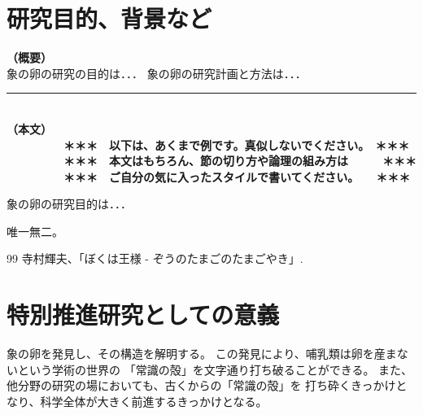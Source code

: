 \documentclass[11pt,a4j,dvipdfmx]{jarticle} 					%
\newcommand{\研究課題名}{象の卵}
\newcommand{\研究機関名}{逢坂大学}
\newcommand{\研究代表者氏名}{湯川秀樹}
\newcommand{\研究期間の最終元号年度}{10}  %
\begin{document}

\section{研究目的、背景など}

\JSPSInstructions		%
\noindent
\mbox{\textbf{（概要）}}\\
	象の卵の研究の目的は．．．	
	象の卵の研究計画と方法は．．．

\noindent
\rule{\linewidth}{1pt}\\
\noindent
\mbox{\textbf{（本文）}}
\textbf{\\　　　　　＊＊＊　以下は、あくまで例です。真似しないでください。　＊＊＊\\
　　　　　＊＊＊　本文はもちろん、節の切り方や論理の組み方は　　　＊＊＊\\
　　　　　＊＊＊　ご自分の気に入ったスタイルで書いてください。　　＊＊＊}

	 象の卵の研究目的は．．．

	唯一無二。




	\vspace{1cm}
	\begin{thebibliography}{99}
		 寺村輝夫、「ぼくは王様 - ぞうのたまごのたまごやき」.
	\end{thebibliography}




\section{特別推進研究としての意義}

	象の卵を発見し、その構造を解明する。
	この発見により、哺乳類は卵を産まないという学術の世界の
	「常識の殻」を文字通り打ち破ることができる。
	また、他分野の研究の場においても、古くからの「常識の殻」を
	打ち砕くきっかけとなり、科学全体が大きく前進するきっかけとなる。
\end{document}
